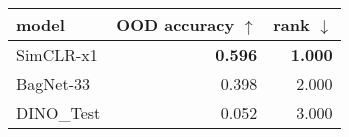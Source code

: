 \begin{tabular}{lrr}
\toprule
     model & OOD accuracy $\uparrow$ & rank $\downarrow$ \\
\midrule
 SimCLR-x1 &          \textbf{0.596} &    \textbf{1.000} \\
 BagNet-33 &                   0.398 &             2.000 \\
DINO\_Test &                   0.052 &             3.000 \\
\bottomrule
\end{tabular}

